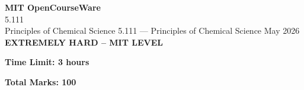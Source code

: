 \documentclass[12pt,a4paper]{exam}
\begin{document}
\begin{center}
{\LARGE \textbf{MIT OpenCourseWare}}\\5.111\\Principles of Chemical Science
\vspace{0.5cm}
{5.111} --- {Principles of Chemical Science}
\vspace{0.3cm}
May 2026
\vspace{0.3cm}
\textbf{EXTREMELY HARD -- MIT LEVEL}
\end{center}

\begin{center}
\textbf{Time Limit: 3 hours}
\end{center}

\begin{center}
\textbf{Total Marks: 100}
\end{center}

\vspace{0.5cm}
\end{document}
